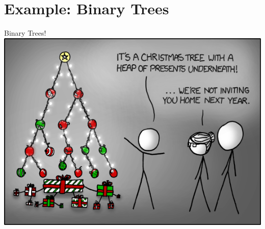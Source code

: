 \documentclass[11pt]{beamer}
\begin{document}
\section[Trees]{Example: Binary Trees}
\begin{frame}{Binary Trees!}
\center
\includegraphics[scale=0.4]{tree.png}
\end{frame}
\end{document}
